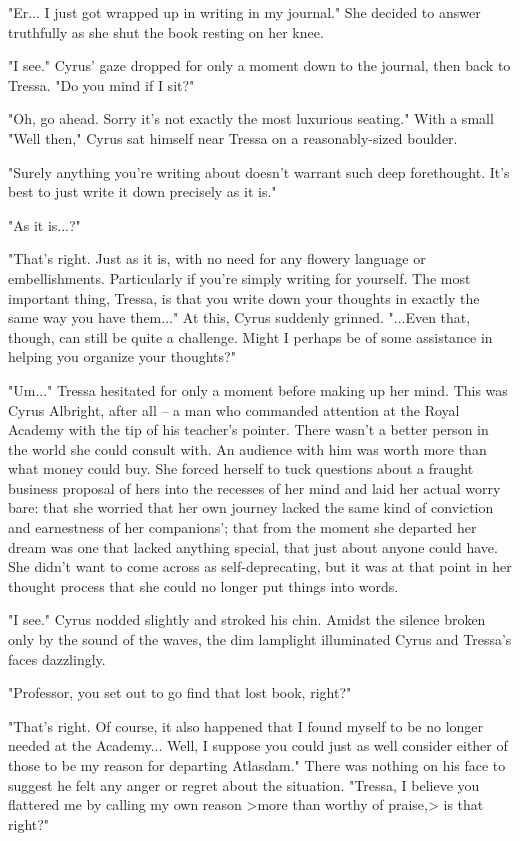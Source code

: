"Er... I just got wrapped up in writing in my journal." She decided to answer truthfully as she shut the book resting on her knee.

"I see." Cyrus' gaze dropped for only a moment down to the journal, then back to Tressa. "Do you mind if I sit?"

"Oh, go ahead. Sorry it's not exactly the most luxurious seating." With a small "Well then," Cyrus sat himself near Tressa on a reasonably-sized boulder.

"Surely anything you're writing about doesn't warrant such deep forethought. It's best to just write it down precisely as it is."

"As it is...?"

"That's right. Just as it is, with no need for any flowery language or embellishments. Particularly if you're simply writing for yourself. The most important thing, Tressa, is that you write down your thoughts in exactly the same way you have them..." At this, Cyrus suddenly grinned. "...Even that, though, can still be quite a challenge. Might I perhaps be of some assistance in helping you organize your thoughts?"

"Um..." Tressa hesitated for only a moment before making up her mind. This was Cyrus Albright, after all -- a man who commanded attention at the Royal Academy with the tip of his teacher's pointer. There wasn't a better person in the world she could consult with. An audience with him was worth more than what money could buy. She forced herself to tuck questions about a fraught business proposal of hers into the recesses of her mind and laid her actual worry bare: that she worried that her own journey lacked the same kind of conviction and earnestness of her companions'; that from the moment she departed her dream was one that lacked anything special, that just about anyone could have. She didn't want to come across as self-deprecating, but it was at that point in her thought process that she could no longer put things into words.

"I see." Cyrus nodded slightly and stroked his chin. Amidst the silence broken only by the sound of the waves, the dim lamplight illuminated Cyrus and Tressa's faces dazzlingly.

"Professor, you set out to go find that lost book, right?"

"That's right. Of course, it also happened that I found myself to be no longer needed at the Academy... Well, I suppose you could just as well consider either of those to be my reason for departing Atlasdam." There was nothing on his face to suggest he felt any anger or regret about the situation. "Tressa, I believe you flattered me by calling my own reason >more than worthy of praise,> is that right?"

